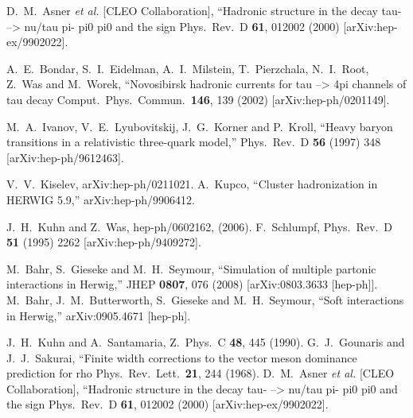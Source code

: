 \documentclass{article}
\begin{document}
\begin{thebibliography}{99}
  D.~M.~Asner {\it et al.}  [CLEO Collaboration],
   ``Hadronic structure in the decay tau- --> nu/tau pi- pi0 pi0 and the  sign
  Phys.\ Rev.\  D {\bf 61}, 012002 (2000)
  [arXiv:hep-ex/9902022].

  A.~E.~Bondar, S.~I.~Eidelman, A.~I.~Milstein, T.~Pierzchala, N.~I.~Root, Z.~Was and M.~Worek,
   ``Novosibirsk hadronic currents for tau --> 4pi channels of tau decay
  Comput.\ Phys.\ Commun.\  {\bf 146}, 139 (2002)
  [arXiv:hep-ph/0201149].

  M.~A.~Ivanov, V.~E.~Lyubovitskij, J.~G.~Korner and P.~Kroll,
  ``Heavy baryon transitions in a relativistic three-quark model,''
  Phys.\ Rev.\  D {\bf 56} (1997) 348
  [arXiv:hep-ph/9612463].

 V.~V.~Kiselev, arXiv:hep-ph/0211021.
  A.~Kupco,
  ``Cluster hadronization in HERWIG 5.9,''
  arXiv:hep-ph/9906412.

 J.~H.~Kuhn and Z.~Was, hep-ph/0602162, (2006).
F.~Schlumpf,
Phys.\ Rev.\  D {\bf 51} (1995) 2262 [arXiv:hep-ph/9409272].

  M.~Bahr, S.~Gieseke and M.~H.~Seymour,
  ``Simulation of multiple partonic interactions in Herwig,''
  JHEP {\bf 0807}, 076 (2008)
  [arXiv:0803.3633 [hep-ph]].
  M.~Bahr, J.~M.~Butterworth, S.~Gieseke and M.~H.~Seymour,
  ``Soft interactions in Herwig,''
  arXiv:0905.4671 [hep-ph].

  J.~H.~Kuhn and A.~Santamaria,
  Z.\ Phys.\  C {\bf 48}, 445 (1990).
  G.~J.~Gounaris and J.~J.~Sakurai,
   ``Finite width corrections to the vector meson dominance prediction for rho
  Phys.\ Rev.\ Lett.\  {\bf 21}, 244 (1968).
  D.~M.~Asner {\it et al.}  [CLEO Collaboration],
   ``Hadronic structure in the decay tau- --> nu/tau pi- pi0 pi0 and the  sign
  Phys.\ Rev.\  D {\bf 61}, 012002 (2000)
  [arXiv:hep-ex/9902022].


\end{thebibliography}
\end{document}
